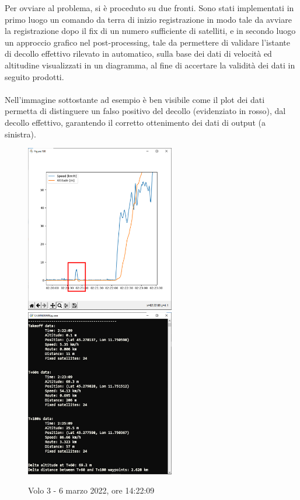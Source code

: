 \documentclass[12pt]{article}
\begin{document}
Per ovviare al problema, si è proceduto su due fronti. Sono stati implementati in primo luogo un comando da terra di inizio registrazione in modo tale da avviare la registrazione dopo il fix di un numero sufficiente di satelliti, e in secondo luogo un approccio grafico nel post-processing, tale da permettere di validare l'istante di decollo effettivo rilevato in automatico, sulla base dei dati di velocità ed altitudine visualizzati in un diagramma, al fine di accertare la validità dei dati in seguito prodotti. 
\\\\
Nell'immagine sottostante ad esempio è ben visibile come il plot dei dati permetta di distinguere un falso positivo del decollo (evidenziato in rosso), dal decollo effettivo, garantendo il corretto ottenimento dei dati di output (a sinistra).

\begin{figure}[!h]
	\centering
	\includegraphics[width=6.5cm]{img/diagramma-decollo}
	\quad
	\includegraphics[width=6.5cm]{img/screenshot}
	\captionsetup{labelformat=empty}
	\caption{Volo 3 - 6 marzo 2022, ore 14:22:09}
\end{figure}
\end{document}
